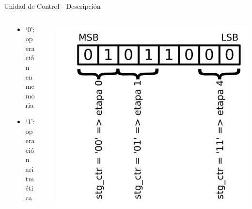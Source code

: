 \begin{frame}{Unidad de Control - Descripción}
\begin{itemize}
{\begin{columns}[T]
\begin{column}{.5\textwidth}
\begin{columns}[T]
\begin{column}{.2\textwidth}
	      \end{column}
          \begin{column}{.8\textwidth}
	        \begin{itemize}
	          \item<6-> `0': operación en memoria
	          \item<6-> `1': operación aritmética
	        \end{itemize}
	      \end{column}
	      \begin{column}{.1\textwidth}
	      
	      \end{column}
	    \end{columns}
	  \end{column}
	  
	  \begin{column}{.5\textwidth}
	    \begin{center}
          \advance\leftskip-0.2cm
          \includegraphics[scale=0.22]{./figures/r4conts.png}
        \end{center}
        \begin{columns}[T]
	      \begin{column}{.2\textwidth}
	      

\end{column}
\end{columns}
\end{column}
\end{columns}}
\end{itemize}
\end{frame}
